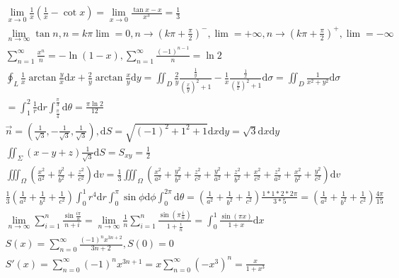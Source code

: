 \documentclass{article}
\begin{document}
\begin{align*}
    \lim_{x \to 0}\frac{1}{x}\left(\frac{1}{x}-\cot x\right) = \lim_{x \to 0}\frac{\tan x - x}{x^3} = \frac{1}{3} \\ 
    \lim_{n \to \infty} \tan n , n = k\pi \lim = 0,n \to \left(k\pi+\frac{\pi}{2}\right)^{-} ,\lim = +\infty,n \to \left(k\pi+\frac{\pi}{2}\right)^{+} ,\lim = -\infty\\
    \sum_{n=1}^{\infty} \frac{x^n}{n} = -\ln(1-x) ,\sum_{n=1}^{\infty} \frac{(-1)^{n-1}}{n} = \ln 2 \\
    \oint_{L} \frac{1}{x}\arctan \frac{y}{x}\mathrm{d}x + \frac{2}{y}\arctan \frac{x}{y}\mathrm{d}y = \iint_{D} \frac{2}{y}\frac{\frac{1}{y}}{\left(\frac{x}{y}\right)^2+1} - \frac{1}{x}\frac{\frac{1}{x}}{\left(\frac{y}{x}\right)^2+1} \mathrm{d}\sigma = \iint_{D} \frac{1}{x^2+y^2} \mathrm{d}\sigma \\ 
    = \int_{1}^{2} \frac{1}{r}\mathrm{d}r \int_{\frac{\pi}{4}}^{\frac{\pi}{3}}\mathrm{d}\theta = \frac{\pi \ln 2}{12} \\
    \vec{n} = \left(\frac{1}{\sqrt{3}},-\frac{1}{\sqrt{3}},\frac{1}{\sqrt{3}}\right), \mathrm{d}S = \sqrt{(-1)^2+1^2+1}\mathrm{d}x\mathrm{d}y=\sqrt{3}\mathrm{d}x\mathrm{d}y \\
    \iint_{\Sigma} (x-y+z) \frac{1}{\sqrt{3}} \mathrm{d}S = S_{xy} = \frac{1}{2} \\ 
    \iiint_{\Omega} \left(\frac{x^2}{a^2}+\frac{y^2}{b^2}+\frac{z^2}{c^2}\right) \mathrm{d}v = \frac{1}{3} \iiint_{\Omega} \left(\frac{x^2}{a^2}+\frac{y^2}{b^2}+\frac{z^2}{c^2}+\frac{y^2}{a^2}+\frac{z^2}{b^2}+\frac{x^2}{c^2}+\frac{z^2}{a^2}+\frac{x^2}{b^2}+\frac{y^2}{c^2}\right)\mathrm{d}v\\ 
    \frac{1}{3} \left(\frac{1}{a^2}+\frac{1}{b^2}+\frac{1}{c^2}\right) \int_{0}^{1} r^4 \mathrm{d}r \int_{0}^{\pi} \sin \phi \mathrm{d}\phi \int_{0}^{2\pi} \mathrm{d}\theta = \left(\frac{1}{a^2}+\frac{1}{b^2}+\frac{1}{c^2}\right) \frac{1*1*2*2\pi}{3*5} = \left(\frac{1}{a^2}+\frac{1}{b^2}+\frac{1}{c^2}\right) \frac{4\pi}{15} \\
    \lim_{n \to \infty} \sum_{i=1}^{n}\frac{\sin \frac{i\pi}{n}}{n+i} = \lim_{n \to \infty} \frac{1}{n} \sum_{i=1}^{n} \frac{\sin \left(\pi \frac{i}{n}\right)}{1+\frac{i}{n}} = \int_{0}^{1} \frac{\sin\left(\pi x\right)}{1+x} \mathrm{d}x \\
    S(x) = \sum_{n=0}^{\infty} \frac{(-1)^n x^{3n+2}}{3n+2} ,S(0) = 0 \\
    S'(x) = \sum_{n=0}^{\infty}(-1)^nx^{3n+1} = x\sum_{n=0}^{\infty}(-x^3)^n = \frac{x}{1+x^3} \\

\end{align*}
\end{document}
